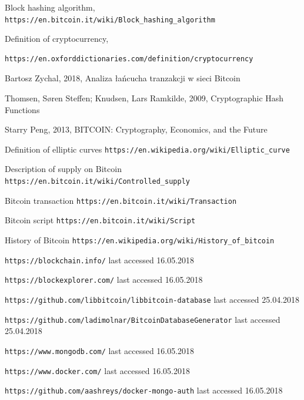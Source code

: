 \documentclass[12pt, en, eng, oneside, final]{mgr}
\begin{document}
\begin{thebibliography}{9}
 
Block hashing algorithm,
\texttt{https://en.bitcoin.it/wiki/Block\_hashing\_algorithm}

Definition of cryptocurrency,
\begin{verbatim}
https://en.oxforddictionaries.com/definition/cryptocurrency
\end{verbatim}

Bartosz Zychal, 2018, Analiza \l{}a\'ncucha tranzakcji w sieci Bitcoin

Thomsen, Søren Steffen; Knudsen, Lars Ramkilde, 2009, Cryptographic Hash Functions

Starry Peng, 2013, BITCOIN: Cryptography, Economics, and the Future

Definition of elliptic curves
\texttt{https://en.wikipedia.org/wiki/Elliptic\_curve}

Description of supply on Bitcoin
\texttt{https://en.bitcoin.it/wiki/Controlled\_supply}

Bitcoin transaction
\texttt{https://en.bitcoin.it/wiki/Transaction}

Bitcoin script
\texttt{https://en.bitcoin.it/wiki/Script}

History of Bitcoin
\texttt{https://en.wikipedia.org/wiki/History\_of\_bitcoin}

\texttt{https://blockchain.info/} last accessed 16.05.2018

\texttt{https://blockexplorer.com/} last accessed 16.05.2018

\texttt{https://github.com/libbitcoin/libbitcoin-database} last accessed 25.04.2018

\texttt{https://github.com/ladimolnar/BitcoinDatabaseGenerator} last accessed 25.04.2018

\texttt{https://www.mongodb.com/} last accessed 16.05.2018

\texttt{https://www.docker.com/} last accessed 16.05.2018

\texttt{https://github.com/aashreys/docker-mongo-auth} last accessed 16.05.2018


\end{thebibliography}
\end{document}
